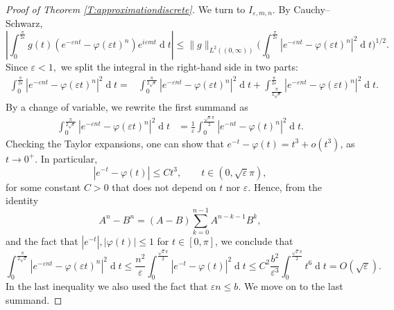 \documentclass[10pt,a4paper]{amsart}
\begin{document}
\begin{proof}[Proof of Theorem \ref{T:approximationdiscrete}]
    We turn to $I_{\varepsilon,m,n}$.  By Cauchy--Schwarz,
    \[
    \left|\int_0^{\frac{\pi}{2\varepsilon}}
    g(t)
    (
    e^{-\varepsilon nt}-\varphi(\varepsilon t)^n
    )e^{i\varepsilon mt}\operatorname{d}\!t\right|
    \leqslant
    \|g\|_{L^2((0,\infty))}
    \Big(
    \int_0^{\frac{\pi}{2\varepsilon}}
    |e^{-\varepsilon nt}
    -\varphi(\varepsilon t)^n
    |^2
    \operatorname{d}\!t
    \Big)^{1/2}.
    \]
    Since $\varepsilon<1,$ we split the integral in the right-hand side in two parts:
    \begin{align*}
        \int_0^{\frac{\pi}{2\varepsilon}}
    |e^{-\varepsilon nt}
    -\varphi(\varepsilon t)^n
    |^2
    \operatorname{d}\!t=&
    \int_0^{\frac{\pi}{2\sqrt\varepsilon}} |e^{-\varepsilon nt}-\varphi(\varepsilon t)^n|^2\operatorname{d}\!t +\int_{\frac{\pi}{2\sqrt\varepsilon}}^{\frac{\pi}{2\varepsilon}}
    |e^{-\varepsilon nt}
    -\varphi(\varepsilon t)^n
    |^2
    \operatorname{d}\!t.
    \end{align*}
    By a change of variable, we rewrite the first summand as
    \begin{align*}
    \int_0^{\frac{\pi}{2\sqrt\varepsilon}} |e^{-\varepsilon nt}-\varphi(\varepsilon t)^n|^2\operatorname{d}\!t&=\frac1\varepsilon\int_0^{\frac{\sqrt\varepsilon\pi}{2}} |e^{- nt}-\varphi(t)^n|^2\operatorname{d}\!t.
    \end{align*}
    Checking the Taylor expansions, one can show that $e^{-t}-\varphi(t)=t^3+o(t^3)$, as $t\to 0^+$. In particular, 
    \[
    |e^{-t}-\varphi(t)|\leqslant Ct^3, \qquad t\in(0,\sqrt{\varepsilon}\pi),
    \]
    for some constant $C>0$ that does not depend on $t$ nor $\varepsilon$. 
    Hence, from the identity
    \[
    A^n-B^n=(A-B)\sum_{k=0}^{n-1} A^{n-k-1}B^k,
    \]
    and the fact that $|e^{-t}|,|\varphi(t)|\leqslant 1$ for $t\in [0,\pi]$, we conclude that
    \begin{equation}\label{eq:I_main}
    \int_0^{\frac{\pi}{2\sqrt\varepsilon}} |e^{-\varepsilon nt}-\varphi(\varepsilon t)^n|^2\operatorname{d}\!t\leqslant \frac{n^2}{\varepsilon}\int_0^{\frac{\sqrt\varepsilon\pi}{2}}|e^{-t}-\varphi(t)|^2\operatorname{ d}\! t\leqslant C^2\frac{b^2}{\varepsilon^3}\int_0^{\frac{\sqrt\varepsilon\pi}{2}}t^6\operatorname{d}\!t =O(\sqrt{\varepsilon}).
    \end{equation}
    In the last inequality we also used the fact that $\varepsilon n\leqslant b$. We move on to the last summand.
    

\end{proof}
\end{document}

